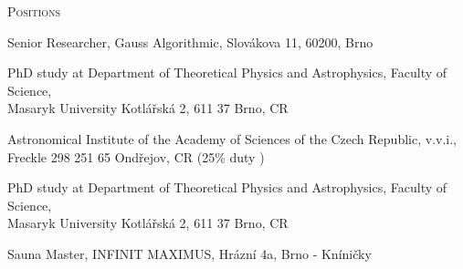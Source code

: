 \documentclass[10pt]{article}
\begin{document}
\begin{cv}




\begin{cvlist}{\large \textsc{Positions}}
\item Senior Researcher, Gauss Algorithmic, Slovákova 11, 60200, Brno
\item PhD study at Department of Theoretical Physics and Astrophysics, Faculty of Science,\\ Masaryk University Kotl\'{a}\v{r}sk\'{a} 2, 611 37 Brno, CR
\item Astronomical Institute of the Academy of Sciences of the Czech
  Republic, v.v.i.,\\ Freckle 298 251 65 Ondřejov, CR (25\% duty )
\item PhD study at Department of Theoretical Physics and Astrophysics, Faculty of Science,\\ Masaryk University Kotl\'{a}\v{r}sk\'{a} 2, 611 37 Brno, CR
\item Sauna Master, INFINIT MAXIMUS, Hrázní 4a, Brno - Kníničky
\end{cvlist}


\end{cv}
\end{document}
